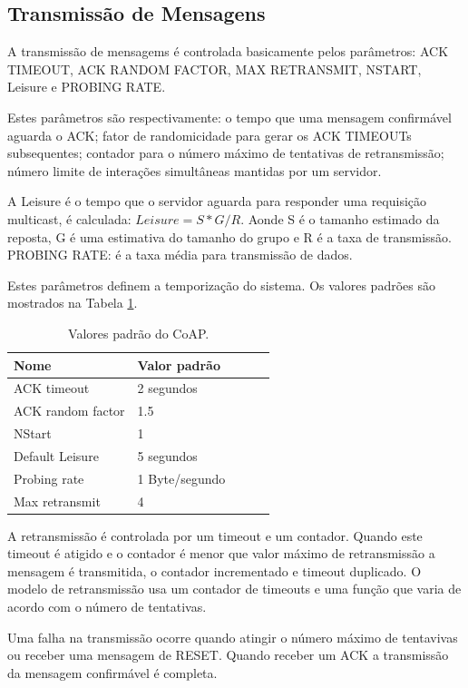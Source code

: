 \subsection{Transmiss\~ao de Mensagens}
A transmiss\~ao de mensagems \'e controlada basicamente pelos par\^ametros: ACK TIMEOUT, ACK RANDOM FACTOR, MAX RETRANSMIT, NSTART, Leisure e PROBING RATE.

Estes par\^ametros s\~ao respectivamente: o tempo que uma mensagem confirm\'avel aguarda o ACK; fator de randomicidade para gerar os ACK TIMEOUTs subsequentes; contador para o n\'umero m\'aximo de tentativas de retransmiss\~ao; n\'umero limite de intera\c{c}\~oes simult\^aneas mantidas por um servidor.

A Leisure \'e o tempo que o servidor aguarda para responder uma requisi\c{c}\~ao multicast, \'e calculada: $Leisure = S * G / R$. Aonde S \'e o tamanho estimado da reposta, G \'e uma estimativa do tamanho do grupo e R \'e a taxa de transmiss\~ao. PROBING RATE: \'e a taxa m\'edia para transmiss\~ao de dados.

    Estes par\^ametros definem a temporiza\c{c}\~ao do sistema. Os valores padr\~oes s\~ao mostrados na Tabela \ref{coapDefault}.
\begin{table}[h]
\label{coapDefault}
\centering
\begin{tabular}{@{}lllll@{}}
\toprule
Nome & Valor padr\~ao & \\ \midrule
ACK timeout & 2 segundos & \\
ACK random factor & 1.5 & \\
NStart & 1 & \\
Default Leisure & 5 segundos & \\
Probing rate & 1 Byte/segundo & \\
Max retransmit & 4 &  \\ \midrule
\end{tabular}
\caption{Valores padr\~ao do CoAP.}
\end{table}

A retransmiss\~ao \'e controlada por um timeout e um contador. Quando este timeout \'e atigido e o contador \'e menor que valor m\'aximo de retransmiss\~ao a mensagem \'e transmitida, o contador incrementado e timeout duplicado. O modelo de retransmiss\~ao usa um contador de timeouts e uma fun\c{c}\~ao que varia de acordo com o n\'umero de tentativas.

Uma falha na transmiss\~ao ocorre quando atingir o n\'umero m\'aximo de tentavivas ou receber uma mensagem de RESET. Quando receber um ACK a transmiss\~ao da mensagem confirm\'avel \'e completa.


